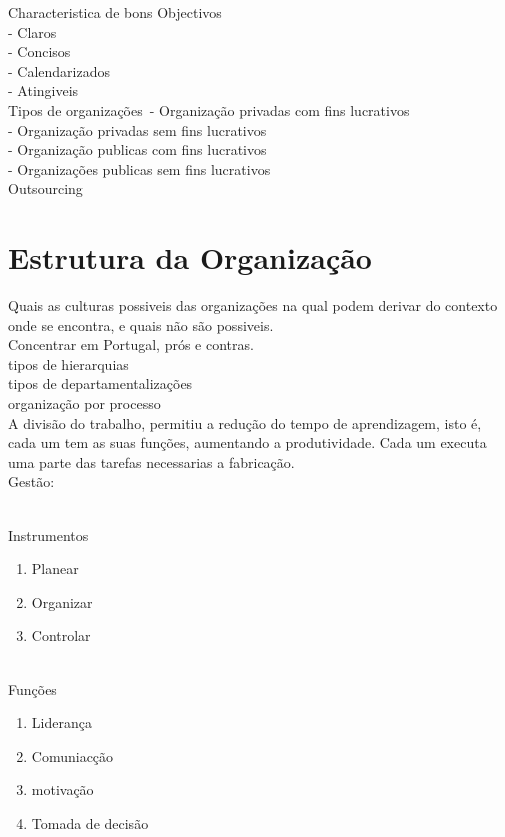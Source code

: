 Characteristica de bons Objectivos\\
- Claros\\
- Concisos\\
- Calendarizados\\
- Atingiveis\\


Tipos de organizações\
- Organização privadas com fins lucrativos\\
- Organização privadas sem fins lucrativos\\
- Organização publicas com fins lucrativos\\
- Organizações publicas sem fins lucrativos\\


Outsourcing\\



\section{Estrutura da Organização}
Quais as culturas possiveis das organizações na qual podem derivar do contexto onde se encontra, e quais não são possiveis.\\

Concentrar em Portugal, prós e contras.\\


tipos de hierarquias\\
tipos de departamentalizações\\
organização por processo\\

A divisão do trabalho, permitiu a redução do tempo de aprendizagem, isto é, cada um tem as suas funções, aumentando a produtividade. Cada um executa uma parte das tarefas necessarias a fabricação.\\

\newpage
Gestão:\\ \\
\begin{minipage}{20cm}
\begin{minipage}{5cm}
Instrumentos
\begin{enumerate}
\item Planear
\item Organizar
\item Controlar\\ \\
\end{enumerate}
\end{minipage}
\begin{minipage}{5cm}
Funções
\begin{enumerate}
\item Liderança
\item Comuniacção
\item motivação
\item Tomada de decisão
\end{enumerate}
\end{minipage}
\end{minipage}

